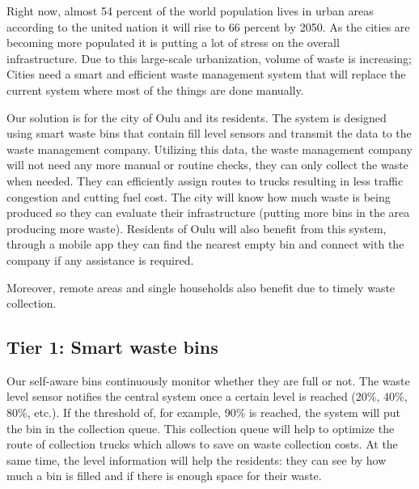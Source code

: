 \documentclass{article}
\begin{document}

Right now, almost 54 percent of the world population lives in urban areas according to the united
nation it will rise to 66 percent by 2050. As the cities are becoming more populated it is putting a
lot of stress on the overall infrastructure. Due to this large-scale urbanization, volume of waste
is increasing; Cities need a smart and efficient waste management system that will replace the
current system where most of the things are done manually.

Our solution is for the city of Oulu and its residents. The system is designed using smart waste
bins that contain fill level sensors and transmit the data to the waste management company.
Utilizing this data, the waste management company will not need any more manual or routine checks,
they can only collect the waste when needed. They can efficiently assign routes to trucks resulting
in less traffic congestion and cutting fuel cost. The city will know how much waste is being
produced so they can evaluate their infrastructure (putting more bins in the area producing more
waste). Residents of Oulu will also benefit from this system, through a mobile app they can find the
nearest empty bin and connect with the company if any assistance is required.

Moreover, remote areas and single households also benefit due to timely waste collection.

\subsection{Tier 1: Smart waste bins}

Our self-aware bins continuously monitor whether they are full or not. The waste level sensor
notifies the central system once a certain level is reached (20\%, 40\%, 80\%, etc.). If the
threshold of, for example, 90\% is reached, the system will put the bin in the collection queue.
This collection queue will help to optimize the route of collection trucks which allows to save on
waste collection costs. At the same time, the level information will help the residents: they can
see by how much a bin is filled and if there is enough space for their waste.
\end{document}

